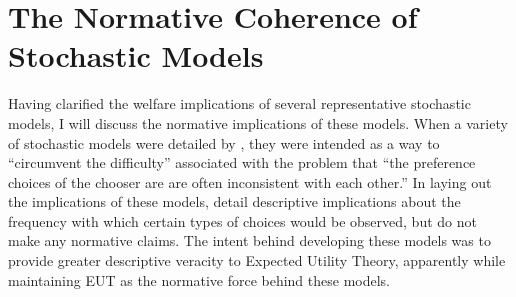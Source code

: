 \documentclass[../main.tex]{subfiles}
\begin{document}
\section{The Normative Coherence of Stochastic Models}



Having clarified the welfare implications of several representative stochastic models, I will discuss the normative implications of these models.
When a variety of stochastic models were detailed by \textcite{Becker1963}, they were intended as a way to \enquote{circumvent the difficulty} associated with the problem that \enquote{the preference choices of the chooser are are often inconsistent with each other.}
In laying out the implications of these models, \textcite{Becker1963} detail descriptive implications about the frequency with which certain types of choices would be observed, but do not make any normative claims.
The intent behind developing these models was to provide greater descriptive veracity to Expected Utility Theory, apparently while maintaining EUT as the normative force behind these models.
\end{document}
